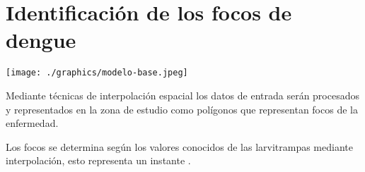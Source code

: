 \section{Identificación de los focos de dengue}
\label{sec:solucion-instantanea}
\texttt{[image: ./graphics/modelo-base.jpeg]}

Mediante técnicas de interpolación espacial los datos de entrada serán procesados y representados en la zona de estudio como polígonos que representan focos de la enfermedad.

Los focos se determina según los valores conocidos de las larvitrampas mediante interpolación, esto representa un instante \cite{AnusuyaSpeech20097}.
